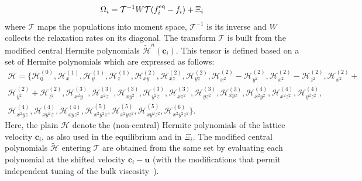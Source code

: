 \begin{equation}
    \Omega_i = \mathcal{T}^{-1}W\mathcal{T}(f^{\rm eq}_i - f_i) + \Xi_i\label{eq:correc1}
\end{equation}
where $\mathcal{T}$ maps the populations into moment space, $\mathcal{T}^{-1}$ is its inverse and $W$ collects the relaxation rates on its diagonal. The transform $\mathcal{T}$ is built from the modified central Hermite polynomials $\widetilde{\mathcal{H}}^n(\bm{c}_i)$. This tensor is defined based on a set of Hermite polynomials which are expressed as follows:
\begin{equation}
\begin{matrix}
 \mathcal{H} = \{\mathcal{H}_0^{(0)}, \mathcal{H}_x^{(1)}, \mathcal{H}_y^{(1)}, \mathcal{H}_z^{(1)}, \mathcal{H}_{xy}^{(2)}, \mathcal{H}_{xz}^{(2)}, \mathcal{H}_{yz}^{(2)}, \mathcal{H}_{x^2}^{(2)}-\mathcal{H}_{y^2}^{(2)}, \mathcal{H}_{x^2}^{(2)}-\mathcal{H}_{z^2}^{(2)},\mathcal{H}_{x^2}^{(2)}+\\\mathcal{H}_{y^2}^{(2)} +\mathcal{H}_{z^2}^{(2)}, \mathcal{H}_{x^2y}^{(3)},
 \mathcal{H}_{x^2z}^{(3)},\mathcal{H}_{xy^2}^{(3)},\mathcal{H}_{y^2z}^{(3)}, \mathcal{H}_{xz^2}^{(3)},\mathcal{H}_{yz^2}^{(3)},
\mathcal{H}_{xyz}^{(3)}, \mathcal{H}_{x^2y^2}^{(4)}, \mathcal{H}_{x^2z^2}^{(4)}, \mathcal{H}_{y^2z^2}^{(4)},\\  \mathcal{H}_{x^2yz}^{(4)},  \mathcal{H}_{xy^2z}^{(4)}, \mathcal{H}_{xyz^2}^{(4)},\mathcal{H}_{x^2y^2z}^{(5)},  \mathcal{H}_{x^2yz^2}^{(5)}, \mathcal{H}_{xy^2z^2}^{(5)}, \mathcal{H}_{x^2y^2z^2}^{(6)} \}.
\end{matrix}
\label{Eq:LBM-3dh}
\end{equation}
Here, the plain $\mathcal{H}$ denote the (non-central) Hermite polynomials of the lattice velocity $\bm{c}_i$, as also used in the equilibrium and in $\Xi_i$. The modified central polynomials $\widetilde{\mathcal{H}}$ entering $\mathcal{T}$ are obtained from the same set by evaluating each polynomial at the shifted velocity $\bm{c}_i-\bm{u}$ (with the modifications that permit independent tuning of the bulk viscosity~\cite{hosseini2022lattice}).

